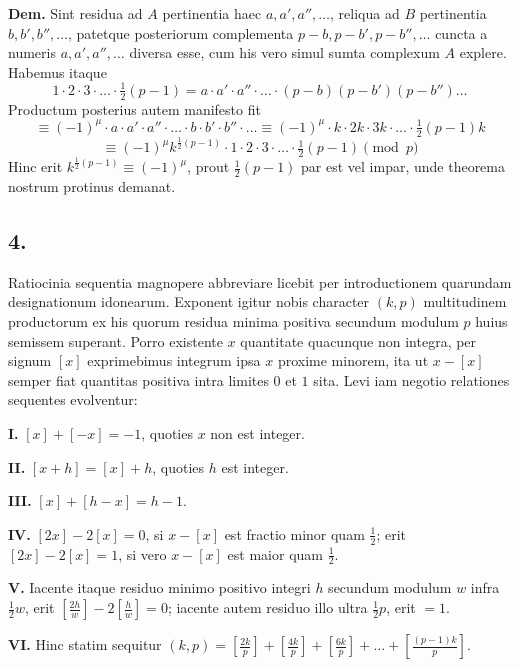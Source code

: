 \documentclass[12pt,a4paper]{article}
\theoremstyle{plain}
\begin{document}
\noindent\textbf{Dem.} Sint residua ad $A$ pertinentia haec $a, a', a'', \ldots$, reliqua ad $B$ pertinentia $b, b', b'', \ldots$, patetque posteriorum complementa $p-b, p-b', p-b'', \ldots$ cuncta a numeris $a, a', a'', \ldots$ diversa esse, cum his vero simul sumta complexum $A$ explere. Habemus itaque
\[
1 \cdot 2 \cdot 3 \cdot \ldots \cdot \tfrac{1}{2}(p-1) = a \cdot a' \cdot a'' \cdot \ldots \cdot (p-b)(p-b')(p-b'') \ldots
\]
Productum posterius autem manifesto fit
\[
\equiv (-1)^{\mu} \cdot a \cdot a' \cdot a'' \cdot \ldots \cdot b \cdot b' \cdot b'' \cdot \ldots \equiv (-1)^{\mu} \cdot k \cdot 2k \cdot 3k \cdot \ldots \cdot \tfrac{1}{2}(p-1)k
\]
\[
\equiv (-1)^{\mu} k^{\frac{1}{2}(p-1)} \cdot 1 \cdot 2 \cdot 3 \cdot \ldots \cdot \tfrac{1}{2}(p-1) \pmod{p}
\]
Hinc erit $k^{\frac{1}{2}(p-1)} \equiv (-1)^{\mu}$, prout $\frac{1}{2}(p-1)$ par est vel impar, unde theorema nostrum protinus demanat.

\subsection*{4.}

Ratiocinia sequentia magnopere abbreviare licebit per introductionem quarundam designationum idonearum. Exponent igitur nobis character $(k, p)$ multitudinem productorum ex his quorum residua minima positiva secundum modulum $p$ huius semissem superant. Porro existente $x$ quantitate quacunque non integra, per signum $[x]$ exprimebimus integrum ipsa $x$ proxime minorem, ita ut $x - [x]$ semper fiat quantitas positiva intra limites $0$ et $1$ sita. Levi iam negotio relationes sequentes evolventur:

\medskip
\noindent\textbf{I.} $[x] + [-x] = -1$, quoties $x$ non est integer.

\medskip
\noindent\textbf{II.} $[x + h] = [x] + h$, quoties $h$ est integer.

\medskip
\noindent\textbf{III.} $[x] + [h - x] = h - 1$.

\medskip
\noindent\textbf{IV.} $[2x] - 2[x] = 0$, si $x - [x]$ est fractio minor quam $\frac{1}{2}$; erit $[2x] - 2[x] = 1$, si vero $x - [x]$ est maior quam $\frac{1}{2}$.

\medskip
\noindent\textbf{V.} Iacente itaque residuo minimo positivo integri $h$ secundum modulum $w$ infra $\frac{1}{2}w$, erit $[\frac{2h}{w}] - 2[\frac{h}{w}] = 0$; iacente autem residuo illo ultra $\frac{1}{2}p$, erit $= 1$.

\medskip
\noindent\textbf{VI.} Hinc statim sequitur $(k, p) = [\frac{2k}{p}] + [\frac{4k}{p}] + [\frac{6k}{p}] + \ldots + [\frac{(p-1)k}{p}]$.
\end{document}

